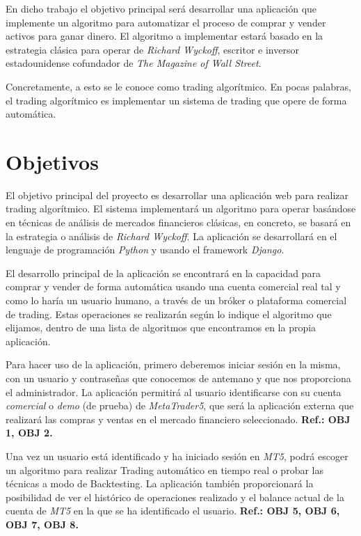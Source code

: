 En dicho trabajo el objetivo principal será desarrollar una aplicación que implemente un algoritmo para automatizar el proceso de comprar y vender activos para ganar dinero. El algoritmo a implementar estará basado en la estrategia clásica para operar de \textit{Richard Wyckoff}, escritor e inversor estadounidense cofundador de \textit{The Magazine of Wall Street}. \newline

Concretamente, a esto se le conoce como trading algorítmico. En pocas palabras, el trading algorítmico es implementar un sistema de trading que opere de forma automática. \newline

	

\section{Objetivos}

El objetivo principal del proyecto es desarrollar una aplicación web para realizar trading algorítmico. El sistema implementará un algoritmo para operar basándose en técnicas de análisis de mercados financieros clásicas, en concreto, se basará en la estrategia o análisis de \textit{Richard Wyckoff}. La aplicación se desarrollará en el lenguaje de programación \textit{Python} y usando el framework \textit{Django}. \newline

El desarrollo principal de la aplicación se encontrará en la capacidad para comprar y vender de forma automática usando una cuenta comercial real tal y como lo haría un usuario humano, a través de un bróker o plataforma comercial de trading. Estas operaciones se realizarán según lo indique el algoritmo que elijamos, dentro de una lista de algoritmos que encontramos en la propia aplicación. \newline

Para hacer uso de la aplicación, primero deberemos iniciar sesión en la misma, con un usuario y contraseñas que conocemos de antemano y que nos proporciona el administrador. La aplicación permitirá al usuario identificarse con su cuenta \textit{comercial} o \textit{demo} (de prueba) de \textit{MetaTrader5}, que será la aplicación externa que realizará las compras y ventas en el mercado financiero seleccionado. \textbf{Ref.: OBJ 1, OBJ 2.} \newline

Una vez un usuario está identificado y ha iniciado sesión en \textit{MT5}, podrá escoger un algoritmo para realizar Trading automático en tiempo real o probar las técnicas a modo de Backtesting. La aplicación también proporcionará la posibilidad de ver el histórico de operaciones realizado y el balance actual de la cuenta de \textit{MT5} en la que se ha identificado el usuario. \textbf{Ref.: OBJ 5, OBJ 6, OBJ 7, OBJ 8.} \newline


